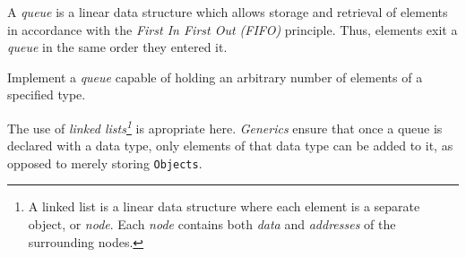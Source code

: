 

\problem A \textit{queue} is a linear data structure which allows storage and retrieval of elements in accordance with the
\textit{First In First Out (FIFO)} principle. Thus, elements exit a \textit{queue} in the same order they entered it.

Implement a \textit{queue} capable of holding an arbitrary number of elements of a specified type.

\solution The use of \textit{linked lists\footnote{A linked list is a linear data structure where each element is a separate object,
or \textit{node}. Each \textit{node} contains both \textit{data} and \textit{addresses} of the surrounding nodes.}} is apropriate
here. \textit{Generics} ensure that once a queue is declared with a data type, only elements of that data type can be added
to it, as opposed to merely storing \texttt{Objects}.

